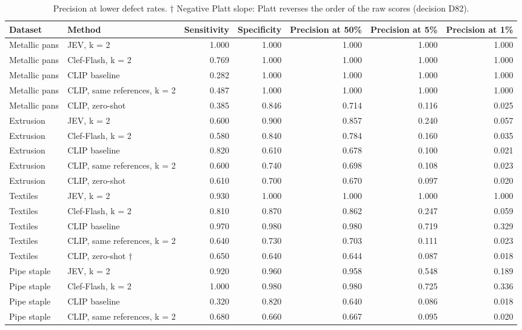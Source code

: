 \begin{table}

\caption{\label{tab:tbl-prevalence}Precision at lower defect rates. † Negative Platt slope: Platt reverses the order of the raw scores (decision D82).}
\centering
\begin{tabular}[t]{llrrrrr}
\toprule
Dataset & Method & Sensitivity & Specificity & Precision at 50\% & Precision at 5\% & Precision at 1\%\\
\midrule
Metallic pans & JEV, k = 2 & 1.000 & 1.000 & 1.000 & 1.000 & 1.000\\
Metallic pans & Clef-Flash, k = 2 & 0.769 & 1.000 & 1.000 & 1.000 & 1.000\\
Metallic pans & CLIP baseline & 0.282 & 1.000 & 1.000 & 1.000 & 1.000\\
Metallic pans & CLIP, same references, k = 2 & 0.487 & 1.000 & 1.000 & 1.000 & 1.000\\
Metallic pans & CLIP, zero-shot & 0.385 & 0.846 & 0.714 & 0.116 & 0.025\\
\addlinespace
Extrusion & JEV, k = 2 & 0.600 & 0.900 & 0.857 & 0.240 & 0.057\\
Extrusion & Clef-Flash, k = 2 & 0.580 & 0.840 & 0.784 & 0.160 & 0.035\\
Extrusion & CLIP baseline & 0.820 & 0.610 & 0.678 & 0.100 & 0.021\\
Extrusion & CLIP, same references, k = 2 & 0.600 & 0.740 & 0.698 & 0.108 & 0.023\\
Extrusion & CLIP, zero-shot & 0.610 & 0.700 & 0.670 & 0.097 & 0.020\\
\addlinespace
Textiles & JEV, k = 2 & 0.930 & 1.000 & 1.000 & 1.000 & 1.000\\
Textiles & Clef-Flash, k = 2 & 0.810 & 0.870 & 0.862 & 0.247 & 0.059\\
Textiles & CLIP baseline & 0.970 & 0.980 & 0.980 & 0.719 & 0.329\\
Textiles & CLIP, same references, k = 2 & 0.640 & 0.730 & 0.703 & 0.111 & 0.023\\
Textiles & CLIP, zero-shot † & 0.650 & 0.640 & 0.644 & 0.087 & 0.018\\
\addlinespace
Pipe staple & JEV, k = 2 & 0.920 & 0.960 & 0.958 & 0.548 & 0.189\\
Pipe staple & Clef-Flash, k = 2 & 1.000 & 0.980 & 0.980 & 0.725 & 0.336\\
Pipe staple & CLIP baseline & 0.320 & 0.820 & 0.640 & 0.086 & 0.018\\
Pipe staple & CLIP, same references, k = 2 & 0.680 & 0.660 & 0.667 & 0.095 & 0.020\\

\end{tabular}
\end{table}
